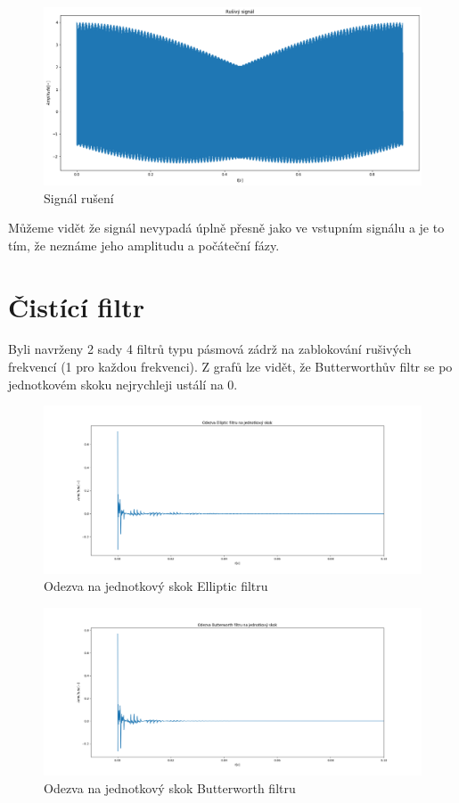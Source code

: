 \documentclass{article}
\begin{document}
\begin{landscape}
\begin{figure}[H] 
	\centering
	\includegraphics[scale=0.55,keepaspectratio]{Figure_25}
	\caption{Signál rušení}
\end{figure}
\end{landscape}

Můžeme vidět že signál nevypadá úplně přesně jako ve vstupním signálu a je to tím, že neznáme jeho amplitudu a počáteční fázy.


\section{Čistící filtr}

Byli navrženy 2 sady 4 filtrů typu pásmová zádrž na zablokování rušivých frekvencí (1 pro každou frekvenci).
Z grafů lze vidět, že Butterworthův filtr se po jednotkovém skoku nejrychleji ustálí na 0.

\begin{figure}[H] 
	\centering
	\includegraphics[scale=0.40,keepaspectratio]{Figure_22}
	\caption{Odezva na jednotkový skok Elliptic filtru}
\end{figure}

\begin{figure}[H] 
	\centering
	\includegraphics[scale=0.40,keepaspectratio]{Figure_24}
	\caption{Odezva na jednotkový skok Butterworth filtru}
\end{figure}
\end{document}
